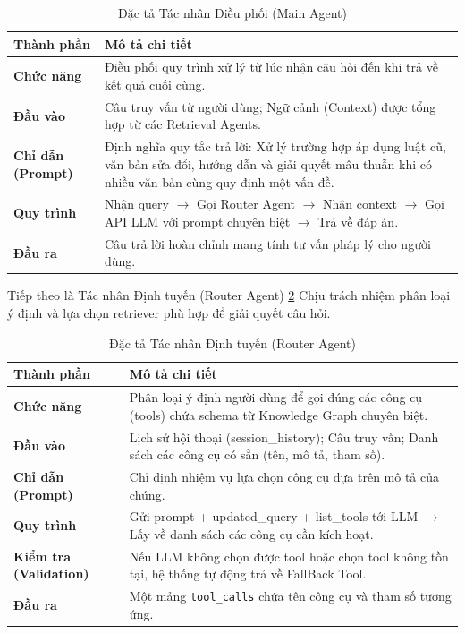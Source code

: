 \documentclass[../DoAn.tex]{subfiles}
\begin{document}
\begin{table}[H]
\centering
\begin{tabular}{|l|p{10cm}|}
\hline
\textbf{Thành phần} & \textbf{Mô tả chi tiết} \\ \hline
\textbf{Chức năng} & Điều phối quy trình xử lý từ lúc nhận câu hỏi đến khi trả về kết quả cuối cùng. \\ \hline
\textbf{Đầu vào} & Câu truy vấn từ người dùng; Ngữ cảnh (Context) được tổng hợp từ các Retrieval Agents. \\ \hline
\textbf{Chỉ dẫn (Prompt)} & Định nghĩa quy tắc trả lời: Xử lý trường hợp áp dụng luật cũ, văn bản sửa đổi, hướng dẫn và giải quyết mâu thuẫn khi có nhiều văn bản cùng quy định một vấn đề. \\ \hline
\textbf{Quy trình} & Nhận query $\rightarrow$ Gọi Router Agent $\rightarrow$ Nhận context $\rightarrow$ Gọi API LLM với prompt chuyên biệt $\rightarrow$ Trả về đáp án. \\ \hline
\textbf{Đầu ra} & Câu trả lời hoàn chỉnh mang tính tư vấn pháp lý cho người dùng. \\ \hline
\end{tabular}
\caption{Đặc tả Tác nhân Điều phối (Main Agent)}
\label{table: main_agent}
\end{table}

Tiếp theo là Tác nhân Định tuyến (Router Agent) \ref{table: router_agent}
Chịu trách nhiệm phân loại ý định và lựa chọn retriever phù hợp để giải quyết câu hỏi.

\begin{table}[H]
\centering
\begin{tabular}{|l|p{10cm}|}
\hline
\textbf{Thành phần} & \textbf{Mô tả chi tiết} \\ \hline
\textbf{Chức năng} & Phân loại ý định người dùng để gọi đúng các công cụ (tools) chứa schema từ Knowledge Graph chuyên biệt. \\ \hline
\textbf{Đầu vào} & Lịch sử hội thoại (session\_history); Câu truy vấn; Danh sách các công cụ có sẵn (tên, mô tả, tham số). \\ \hline
\textbf{Chỉ dẫn (Prompt)} & Chỉ định nhiệm vụ lựa chọn công cụ dựa trên mô tả của chúng. \\ \hline
\textbf{Quy trình} & Gửi prompt + updated\_query + list\_tools tới LLM $\rightarrow$ Lấy về danh sách các công cụ cần kích hoạt. \\ \hline
\textbf{Kiểm tra (Validation)} & Nếu LLM không chọn được tool hoặc chọn tool không tồn tại, hệ thống tự động trả về FallBack Tool.  \\ \hline
\textbf{Đầu ra} & Một mảng \texttt{tool\_calls} chứa tên công cụ và tham số tương ứng. \\ \hline
\end{tabular}
\caption{Đặc tả Tác nhân Định tuyến (Router Agent)}
\label{table: router_agent}
\end{table}
\end{document}
